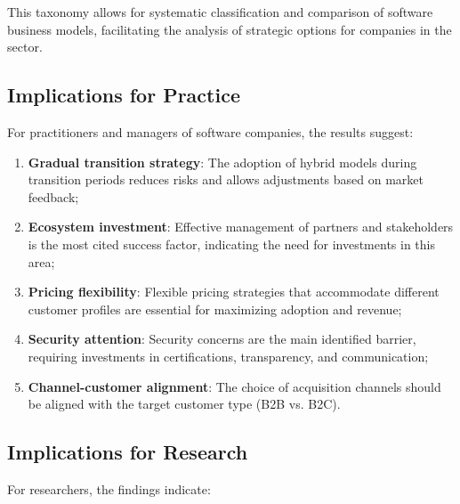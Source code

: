 \documentclass[journal]{IEEEtran}
\begin{document}
This taxonomy allows for systematic classification and comparison of software business models, facilitating the analysis of strategic options for companies in the sector.

\subsection{Implications for Practice}

For practitioners and managers of software companies, the results suggest:

\begin{enumerate}
    \item \textbf{Gradual transition strategy}: The adoption of hybrid models during transition periods reduces risks and allows adjustments based on market feedback;

    \item \textbf{Ecosystem investment}: Effective management of partners and stakeholders is the most cited success factor, indicating the need for investments in this area;

    \item \textbf{Pricing flexibility}: Flexible pricing strategies that accommodate different customer profiles are essential for maximizing adoption and revenue;

    \item \textbf{Security attention}: Security concerns are the main identified barrier, requiring investments in certifications, transparency, and communication;

    \item \textbf{Channel-customer alignment}: The choice of acquisition channels should be aligned with the target customer type (B2B vs. B2C).
\end{enumerate}

\subsection{Implications for Research}

For researchers, the findings indicate:
\end{document}
